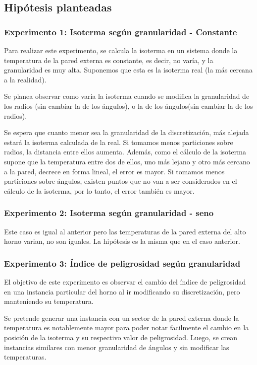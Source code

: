   \subsection{Hipótesis planteadas}

    \subsubsection*{Experimento 1: Isoterma según granularidad - Constante}
      Para realizar este experimento, se calcula la isoterma en un sistema donde la temperatura de la pared externa es constante, es decir, no varía, y la granularidad es muy alta. Suponemos que esta es la isoterma real (la más cercana a la realidad). 

      Se planea observar como varía la isoterma cuando se modifica la granularidad de los radios (sin cambiar la de los ángulos), o la de los ángulos(sin cambiar la de los radios).

      Se espera que cuanto menor sea la granularidad de la discretización, más alejada estará la isoterma calculada de la real. Si tomamos menos particiones sobre radios, la distancia entre ellos aumenta. Además, como el cálculo de la isoterma supone que la temperatura entre dos de ellos, uno más lejano y otro más cercano a la pared, decrece en forma lineal, el error es mayor. Si tomamos menos particiones sobre ángulos, existen puntos que no van a ser considerados en el cálculo de la isoterma, por lo tanto, el error también es mayor.

    \subsubsection*{Experimento 2: Isoterma según granularidad - seno}
      Este caso es igual al anterior pero las temperaturas de la pared externa del alto horno varian, no son iguales. La hipótesis es la misma que en el caso anterior.

    \subsubsection*{Experimento 3: Índice de peligrosidad según granularidad}
      El objetivo de este experimento es observar el cambio del índice de peligrosidad en una instancia particular del horno al ir modificando su discretización, pero manteniendo su temperatura. 

      Se pretende generar una instancia con un sector de la pared externa donde la temperatura es notablemente mayor para poder notar facilmente el cambio en la posición de la isoterma y su respectivo valor de peligrosidad. Luego, se crean instancias similares con menor granularidad de ángulos y sin modificar las temperaturas. 

